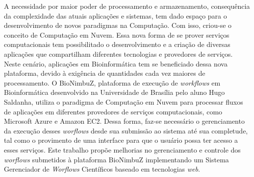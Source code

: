 A necessidade por maior poder de processamento e armazenamento, consequência da complexidade das atuais aplicações e sistemas, tem dado espaço para o desenvolvimento de novos paradigmas na Computação. Com isso, criou-se o conceito de Computação em Nuvem. Essa nova forma de se prover serviços computacionais tem possibilitado o desenvolvimento e a criação de diversas aplicações que compartilham diferentes tecnologias e provedores de serviços. Neste cenário, aplicações em Bioinformática tem se beneficiado dessa nova plataforma, devido à exigência de quantidades cada vez maiores de processamento. O BioNimbuZ, plataforma de execução de \textit{workflows} em Bioinformática desenvolvido na Universidade de Brasília pelo aluno Hugo Saldanha, utiliza o paradigma de Computação em Nuvem para processar fluxos de aplicações em diferentes provedores de serviços computacionais, como Microsoft Azure e Amazon EC2. Dessa forma, faz-se necessário o gerenciamento da execução desses \textit{worflows} desde sua submissão ao sistema até sua completude, tal como o provimento de uma interface para que o usuário possa ter acesso a esses serviços. Este trabalho propõe melhorias no gerenciamento e controle dos \textit{worflows} submetidos à plataforma BioNimbuZ implementando um Sistema Gerenciador de \textit{Worflows} Científicos baseado em tecnologias \textit{web}.